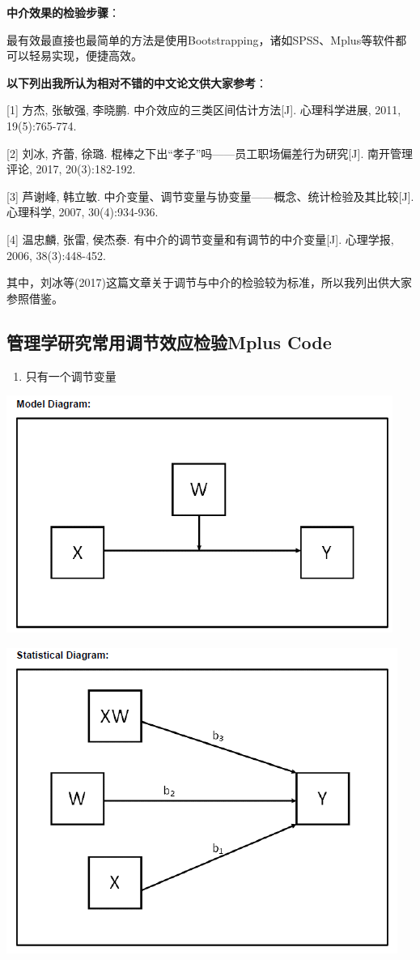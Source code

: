 \documentclass[
]{book}
\providecommand{\tightlist}{%
  \setlength{\itemsep}{0pt}\setlength{\parskip}{0pt}}
\begin{document}
\textbf{中介效果的检验步骤}：

最有效最直接也最简单的方法是使用Bootstrapping，诸如SPSS、Mplus等软件都可以轻易实现，便捷高效。

\textbf{以下列出我所认为相对不错的中文论文供大家参考}：

{[}1{]} 方杰, 张敏强, 李晓鹏. 中介效应的三类区间估计方法{[}J{]}. 心理科学进展, 2011, 19(5):765-774.

{[}2{]} 刘冰, 齐蕾, 徐璐. 棍棒之下出``孝子''吗------员工职场偏差行为研究{[}J{]}. 南开管理评论, 2017, 20(3):182-192.

{[}3{]} 芦谢峰, 韩立敏. 中介变量、调节变量与协变量------概念、统计检验及其比较{[}J{]}. 心理科学, 2007, 30(4):934-936.

{[}4{]} 温忠麟, 张雷, 侯杰泰. 有中介的调节变量和有调节的中介变量{[}J{]}. 心理学报, 2006, 38(3):448-452.

其中，刘冰等(2017)这篇文章关于调节与中介的检验较为标准，所以我列出供大家参照借鉴。

\hypertarget{mocode}{%
\subsection{管理学研究常用调节效应检验Mplus Code}\label{mocode}}

\begin{enumerate}
\def\labelenumi{\arabic{enumi}.}
\tightlist
\item
  只有一个调节变量
\end{enumerate}

\includegraphics{figs/1111.png}

\includegraphics{figs/1112.png}
\end{document}
